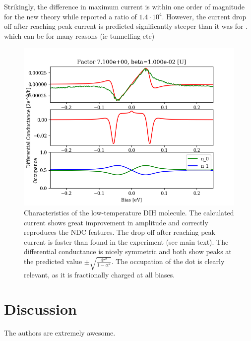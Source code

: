 \documentclass{article}
\begin{document}
\begin{multicols}{2}
        Strikingly, the difference in maximum current is within one order of magnitude for the new theory while \citet{perrinnano} reported a ratio of $1.4\cdot10^{4}$. However, the current drop off after reaching peak current is predicted significantly steeper than it was for \citet{perrinnano}.  {\color{red} which can be for many reasons (ie tunnelling etc)}
        
        
        
    \begin{figure}[b]
        \centering
        \includegraphics[width=\textwidth]{fig/figure_gam0102alpha50tau024capacitive35points200.png}
        \caption{\label{fig:perrinmolecule} Characteristics of the low-temperature DIH molecule. The calculated current shows great improvement in amplitude and correctly reproduces the NDC features. The drop off after reaching peak current  is faster than found in the experiment (see main text). The differential conductance is nicely symmetric and both show peaks at the predicted value $\pm\sqrt{\frac{4\tau^2}{1-\alpha^2}}$. The occupation of the dot is clearly relevant, as it is fractionally charged at all biases.}
    \end{figure}
    
    \section{Discussion}\label{sec:discussion}
    The authors are extremely awesome.
     
\end{multicols}
\end{document}
